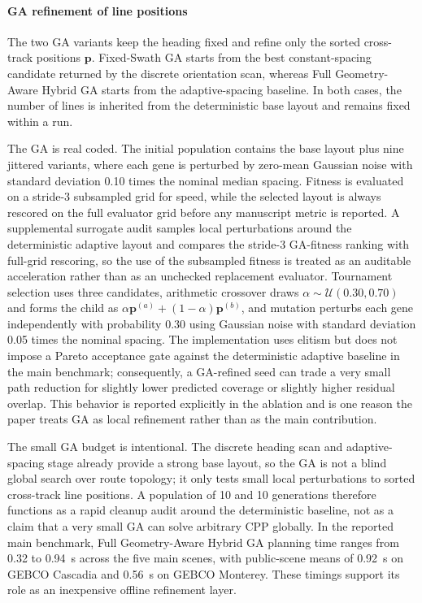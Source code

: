 \documentclass[jmse,article,submit,moreauthors]{Definitions/mdpi}
\begin{document}
\paragraph{GA refinement of line positions}
The two GA variants keep the heading fixed and refine only the sorted cross-track positions $\mathbf{p}$. Fixed-Swath GA starts from the best constant-spacing candidate returned by the discrete orientation scan, whereas Full Geometry-Aware Hybrid GA starts from the adaptive-spacing baseline. In both cases, the number of lines is inherited from the deterministic base layout and remains fixed within a run.

The GA is real coded. The initial population contains the base layout plus nine jittered variants, where each gene is perturbed by zero-mean Gaussian noise with standard deviation 0.10 times the nominal median spacing. Fitness is evaluated on a stride-3 subsampled grid for speed, while the selected layout is always rescored on the full evaluator grid before any manuscript metric is reported. A supplemental surrogate audit samples local perturbations around the deterministic adaptive layout and compares the stride-3 GA-fitness ranking with full-grid rescoring, so the use of the subsampled fitness is treated as an auditable acceleration rather than as an unchecked replacement evaluator. Tournament selection uses three candidates, arithmetic crossover draws $\alpha \sim \mathcal{U}(0.30,0.70)$ and forms the child as $\alpha \mathbf{p}^{(a)} + (1-\alpha)\mathbf{p}^{(b)}$, and mutation perturbs each gene independently with probability 0.30 using Gaussian noise with standard deviation 0.05 times the nominal spacing. The implementation uses elitism but does not impose a Pareto acceptance gate against the deterministic adaptive baseline in the main benchmark; consequently, a GA-refined seed can trade a very small path reduction for slightly lower predicted coverage or slightly higher residual overlap. This behavior is reported explicitly in the ablation and is one reason the paper treats GA as local refinement rather than as the main contribution.

The small GA budget is intentional. The discrete heading scan and adaptive-spacing stage already provide a strong base layout, so the GA is not a blind global search over route topology; it only tests small local perturbations to sorted cross-track line positions. A population of 10 and 10 generations therefore functions as a rapid cleanup audit around the deterministic baseline, not as a claim that a very small GA can solve arbitrary CPP globally. In the reported main benchmark, Full Geometry-Aware Hybrid GA planning time ranges from 0.32 to 0.94~s across the five main scenes, with public-scene means of 0.92~s on GEBCO Cascadia and 0.56~s on GEBCO Monterey. These timings support its role as an inexpensive offline refinement layer.
\end{document}
